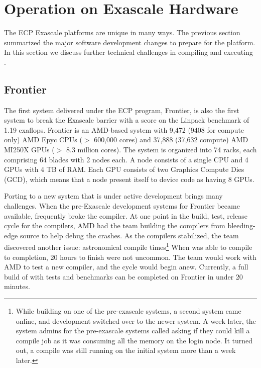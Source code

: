 \section{Operation on Exascale Hardware}

The ECP Exascale platforms are unique in many ways.
The previous section summarized the major software development changes to prepare for the platform.
In this section we discuss further technical challenges in compiling and executing \vtkm.


\subsection{Frontier}
The first system delivered under the ECP program, Frontier, is also the first system to break the Exascale barrier with a score on the Linpack benchmark of 1.19 exaflops. Frontier is an AMD-based system with 9,472 (9408 for compute only) AMD Epyc CPUs ($>$ 600,000 cores) and 37,888 (37,632 compute) AMD MI250X GPUs ($>$ 8.3 million cores). The system is organized into 74 racks, each comprising 64 blades with 2 nodes each. A node consists of a single CPU and 4 GPUs with 4 TB of RAM. Each GPU consists of two Graphics Compute Dies (GCD), which means that a node present itself to device code as having 8 GPUs.

Porting to a new system that is under active development brings many challenges. When the pre-Exascale development systems for Frontier became available, \vtkm frequently broke the compiler. At one point in the build, test, release cycle for the compilers, AMD had the \vtkm team building the compilers from bleeding-edge source to help debug the crashes. As the compilers stabilized, the team discovered another issue: astronomical compile times\footnote{While building on one of the pre-exascale systems, a second system came online, and development switched over to the newer system. A week later, the system admins for the pre-exascale systems called asking if they could kill a compile job as it was consuming all the memory on the login node. It turned out, a compile was still running on the initial system more than a week later.} When \vtkm was able to compile to completion, 20 hours to finish were not uncommon. The team would work with AMD to test a new compiler, and the cycle would begin anew. Currently, a full build of \vtkm with tests and benchmarks can be completed on Frontier in under 20 minutes.


